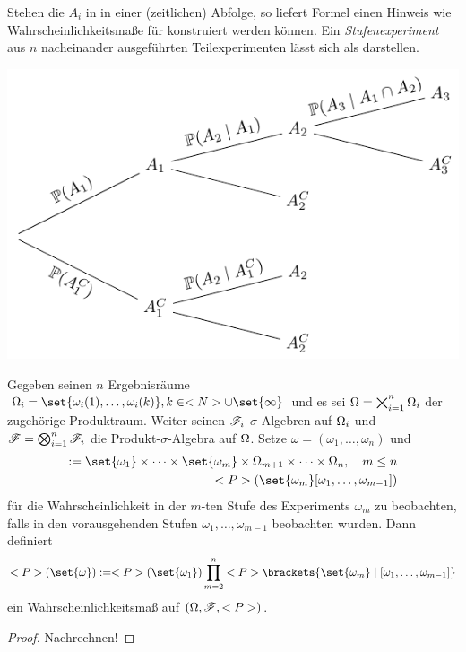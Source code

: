 Stehen die $A_i$ in  in einer (zeitlichen) Abfolge, so liefert Formel einen Hinweis wie Wahrscheinlichkeitsmaße für  konstruiert werden können. Ein \emph{Stufenexperiment} aus $n$ nacheinander ausgeführten Teilexperimenten lässt sich als  darstellen.

\begin{center}
		\includegraphics{./tikz/baum_1.pdf}
\end{center}

\begin{proposition}
	Gegeben seinen $n$ Ergebnisräume $\O_i = \set{\omega_i (1), \dots, \omega_i (k)}, k \in \N \cup \set{\infty}$ und es sei $\Omega = \bigtimes_{i = 1}^n \Omega_i$ der zugehörige Produktraum. Weiter seinen $\mathscr F_i$ $\sigma$-Algebren auf $\Omega_i$ und $\mathscr F = \bigotimes_{i=1}^n \mathscr F_i$ die Produkt-$\sigma$-Algebra auf $\Omega$. Setze $\omega = (\omega_1,\dots,\omega_n)$ und
	\begin{align*}
		[\omega_1,\dots,\omega_m]:= \set{\omega_1}\times \dots \times \set{\omega_m} \times \O_{m+1} \times \cdots \times \O_{n},\quad m\le n\\
		\P(\set{\omega_m}[\omega_1,\dots,\omega_{m-1}])
	\end{align*}
	für die Wahrscheinlichkeit in der $m$-ten Stufe des Experiments $\omega_m$ zu beobachten, falls in den vorausgehenden Stufen $\omega_1,\dots,\omega_{m-1}$ beobachten wurden. Dann definiert
	\begin{align*}
		\P(\set{\omega}) := \P(\set{\omega_1}) \prod_{m=2}^{n}\P\brackets{\set{\omega_m} \mid [\omega_1, \dots, \omega_{m-1}]}
	\end{align*}
	ein Wahrscheinlichkeitsmaß auf $(\Omega, \mathscr F, <P>)$.
\end{proposition}
\begin{proof}
	Nachrechnen!
\end{proof}

